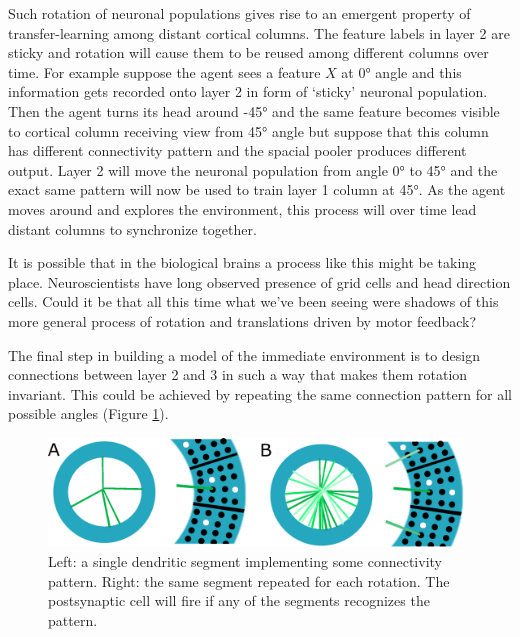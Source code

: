 \documentclass[12pt]{article}
\begin{document}
Such rotation of neuronal populations gives rise to an emergent property of transfer-learning among distant cortical columns. The feature labels in layer 2 are sticky and rotation will cause them to be reused among different columns over time. For example suppose the agent sees a feature $X$ at 0° angle and this information gets recorded onto layer 2 in form of `sticky' neuronal population. Then the agent turns its head around -45° and the same feature becomes visible to cortical column receiving view from 45° angle but suppose that this column has different connectivity pattern and the spacial pooler produces different output. Layer 2 will move the neuronal population from angle 0° to 45° and the exact same pattern will now be used to train layer 1 column at 45°. As the agent moves around and explores the environment, this process will over time lead distant columns to synchronize together.

It is possible that in the biological brains a process like this might be taking place. Neuroscientists have long observed presence of grid cells and head direction cells. 
Could it be that all this time what we've been seeing were shadows of this more general process of rotation and translations driven by motor feedback?

The final step in building a model of the immediate environment is to design connections between layer 2 and 3 in such a way that makes them rotation invariant. This could be achieved by repeating the same connection pattern for all possible angles (Figure \ref{fig:rotation_invariant_pattern}). 

\begin{figure}[!h]
	\centering
	\includegraphics[width=11cm]{rotation_invariant_pattern}
	\caption{Left: a single dendritic segment implementing some connectivity pattern. Right:
	 the same segment repeated for each rotation. The postsynaptic cell will fire if any of the
    segments recognizes the pattern.}
	\label{fig:rotation_invariant_pattern}
\end{figure}
\end{document}
